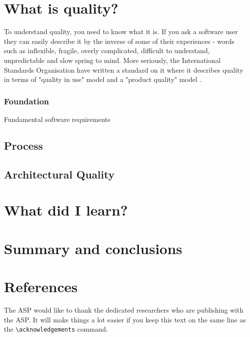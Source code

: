 \documentclass[11pt,twoside]{article}
\begin{document}
\section{What is quality?}
To understand quality, you need to know what it is. If you ask a software user they can easily describe it by the inverse of some of their experiences - words such as inflexible, fragile, overly complicated, difficult to understand, unpredictable and slow spring to mind. More seriously, the International Standards Organisation have written a standard on it where it describes quality in terms of "quality in use" model and a "product quality" model \citep[See][]{iso25010} \cite{ior}. 



\subsubsection{Foundation}
Fundamental software requirements
\subsection{Process}
\subsection{Architectural Quality}

\section{What did I learn?}


\section{Summary and conclusions}



\section{References}


\acknowledgements The ASP would like to thank the dedicated researchers who are publishing with the ASP.  It will make things a lot easier if you keep this text on the same line as the \verb"\acknowledgements" command.


\end{document}
